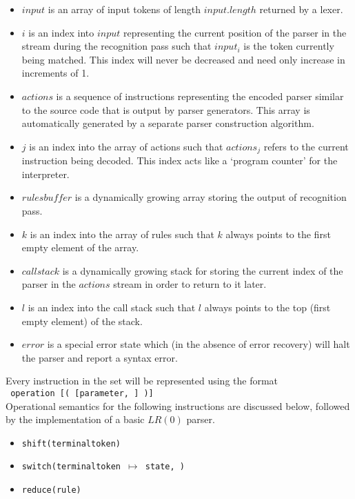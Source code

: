 \documentclass[envcountsame,runningheads]{llncs}
\begin{document}
\begin{itemize}
\item $input$ is an array of input tokens of length $input.length$ returned by a lexer.
\item $i$ is an index into $input$ representing the current position of the parser in the stream during the recognition pass such that $input_i$ is the token currently being matched.
This index will never be decreased and need only increase in increments of 1.
\item $actions$ is a sequence of instructions representing the encoded parser similar to the source code that is output by parser generators. 
This array is automatically generated by a separate parser construction algorithm.
\item $j$ is an index into the array of actions such that $actions_j$ refers to the current instruction being decoded.
This index acts like a `program counter' for the interpreter.
\item $rulesbu\!f\!f\!er$ is a dynamically growing array storing the output of recognition pass.
\item $k$ is an index into the array of rules such that $k$ always points to the first empty element of the array.
\item $callstack$ is a dynamically growing stack for storing the current index of the parser in the $actions$ stream in order to return to it later.
\item $l$ is an index into the call stack such that $l$ always points to the top (first empty element) of the stack.
\item $error$ is a special error state which (in the absence of error recovery) will halt the parser and report a syntax error.
\end{itemize}

Every instruction in the set will be represented using the format\\ \texttt{ operation [( [parameter, \textellipsis] )]}\\

Operational semantics for the following instructions are discussed below, followed by the implementation of a basic $LR(0)$ parser.
\begin{itemize}
\item \texttt{shift(terminaltoken)}
\item \texttt{switch(terminaltoken $\mapsto$ state, \textellipsis)}
\item \texttt{reduce(rule)}
\end{itemize}
\end{document}
